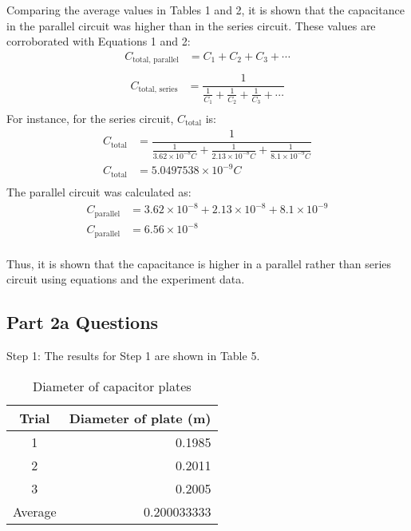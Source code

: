 \documentclass [12pt, letterpaper, twoside] {article}
\begin{document}
Comparing the average values in Tables 1 and 2, it is shown that the capacitance in the parallel circuit was higher than in the series circuit. These values are corroborated with Equations 1 and 2:
\begin{equation}
  \begin{split}
    C_{\text{total, parallel}} &= C_{1} + C_{2} + C_{3} + \cdots \\
  \end{split}
\end{equation}
\begin{equation}
  \begin{split}
    C_{\text{total, series}} &= \dfrac{1}{\tfrac{1}{C_{1}} + \tfrac{1}{C_{2}} + \tfrac{1}{C_{3}} + \cdots} \\
  \end{split}
\end{equation}
 For instance, for the series circuit, \(C_{\text{total}}\) is:
\begin{equation*}
  \begin{split}
    C_{\text{total}} &= \dfrac{1}{\tfrac{1}{3.62\times10^{-8}C} + \tfrac{1}{2.13\times10^{-8}C} + \tfrac{1}{8.1\times10^{-9}C}} \\
    C_{\text{total}} &= 5.0497538\times10^{-9}C \\
  \end{split}
\end{equation*}
The parallel circuit was calculated as:
\begin{equation*}
  \begin{split}
    C_{\text{parallel}} &= 3.62\times10^{-8} + 2.13\times10^{-8} + 8.1\times10^{-9} \\
    C_{\text{parallel}} &= 6.56\times10^{-8} \\
  \end{split}
\end{equation*}

\noindent
Thus, it is shown that the capacitance is higher in a parallel rather than series circuit using equations and the experiment data.

\subsection* {Part 2a Questions}
Step 1: The results for Step 1 are shown in Table 5.

\begin{table}[h!]
  \centering
  \begin{tabular}{| c | r |}
    \hline\hline
    Trial & Diameter of plate (m) \\
    \hline
    1 & 0.1985 \\
    \hline
    2 & 0.2011 \\
    \hline
    3 & 0.2005 \\
    \hline
    Average & 0.200033333 \\
    \hline\hline
  \end{tabular}
  \caption{Diameter of capacitor plates}
\end{table}
\end{document}
